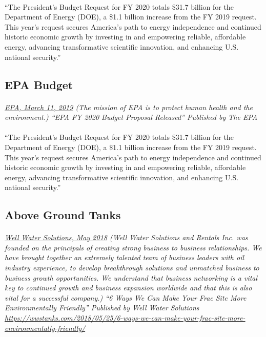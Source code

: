 \documentclass{article}
\begin{document}
\paragraph{}
``The President’s Budget Request for FY 2020 totals \$31.7 billion for the Department of Energy (DOE), a \$1.1 billion increase from the FY 2019 request. This year’s request secures America’s path to energy independence and continued historic economic growth by investing in and empowering reliable, affordable energy, advancing transformative scientific innovation, and enhancing U.S. national security.”

\subsection{EPA Budget}
\paragraph{}
\small
\textit{
\underline{EPA, March 11, 2019}
(The mission of EPA is to protect human health and the environment.) “EPA FY 2020 Budget Proposal Released” Published by The EPA}
\normalsize

\paragraph{}
``The President’s Budget Request for FY 2020 totals \$31.7 billion for the Department of Energy (DOE), a \$1.1 billion increase from the FY 2019 request. This year’s request secures America’s path to energy independence and continued historic economic growth by investing in and empowering reliable, affordable energy, advancing transformative scientific innovation, and enhancing U.S. national security.”

\subsection{Above Ground Tanks}
\paragraph{}
\small
\textit{
\underline{Well Water Solutions, May 2018}
(Well Water Solutions and Rentals Inc. was founded on the principals of creating strong business to business relationships. We have brought together an extremely talented team of business leaders with oil industry experience, to develop breakthrough solutions and unmatched business to business growth opportunities. We understand that business networking is a vital key to continued growth and business expansion worldwide and that this is also vital for a successful company.) “6 Ways We Can Make Your Frac Site More Environmentally Friendly” Published by Well Water Solutions  
\url{https://wwstanks.com/2018/05/25/6-ways-we-can-make-your-frac-site-more-environmentally-friendly/}}
\normalsize
\end{document}
